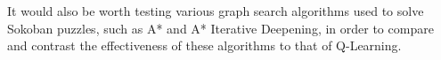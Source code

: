 \documentclass[times, 10pt,twocolumn]{article}
\begin{document}
It would also be worth testing various graph search algorithms used to solve Sokoban puzzles, such as A* and A* Iterative Deepening, in order to compare and contrast the effectiveness of these algorithms to that of Q-Learning.


\appendix
\listoffigures
\listoftables



\end{document}
